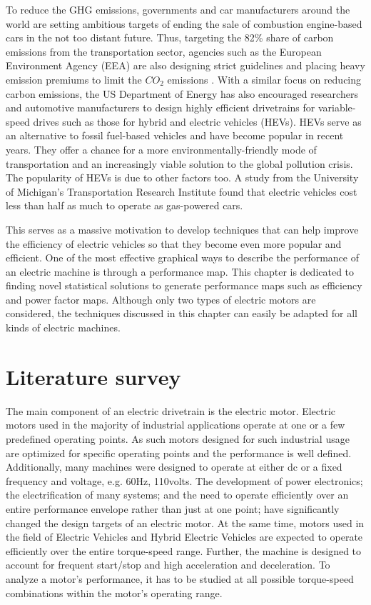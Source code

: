 To reduce the GHG emissions, governments and car manufacturers around the world are setting ambitious targets of ending the sale of combustion engine-based cars in the not too distant future. Thus, targeting the 82\% share of carbon emissions from the transportation sector, agencies such as the European Environment Agency (EEA) are also designing strict guidelines and placing heavy emission premiums to limit the $CO_2$ emissions \parencite{european2016monitoring, european2015evaluating}. With a similar focus on reducing carbon emissions, the US Department of Energy \parencite{yang2015comparative} has also encouraged researchers and automotive manufacturers to design highly efficient drivetrains for variable-speed drives such as those for hybrid and electric vehicles (HEVs). HEVs serve as an alternative to fossil fuel-based vehicles and have become popular in recent years. They offer a chance for a more environmentally-friendly mode of transportation and an increasingly viable solution to the global pollution crisis. The popularity of HEVs is due to other factors too. A study from the University of Michigan's Transportation Research Institute \parencite{sivak2018relative} found that electric vehicles cost less than half as much to operate as gas-powered cars. 

This serves as a massive motivation to develop techniques that can help improve the efficiency of electric vehicles so that they become even more popular and efficient. One of the most effective graphical ways to describe the performance of an electric machine is through a performance map. This chapter is dedicated to finding novel statistical solutions to generate performance maps such as efficiency and power factor maps. Although only two types of electric motors are considered, the techniques discussed in this chapter can easily be adapted for all kinds of electric machines.

\section{Literature survey}

The main component of an electric drivetrain is the electric motor. Electric motors used in the majority of industrial applications operate at one or a few predefined operating points. As such motors designed for such industrial usage are optimized for specific operating points and the performance is well defined. Additionally, many machines were designed to operate at either dc or a fixed frequency and voltage, e.g. 60Hz, 110volts. The development of power electronics; the electrification of many systems; and the need to operate efficiently over an entire performance envelope rather than just at one point; have significantly changed the design targets of an electric motor. At the same time, motors used in the field of Electric Vehicles and Hybrid Electric Vehicles are expected to operate efficiently over the entire torque-speed range. Further, the machine is designed to account for frequent start/stop and high acceleration and deceleration. To analyze a motor's performance, it has to be studied at all possible torque-speed combinations within the motor's operating range.


